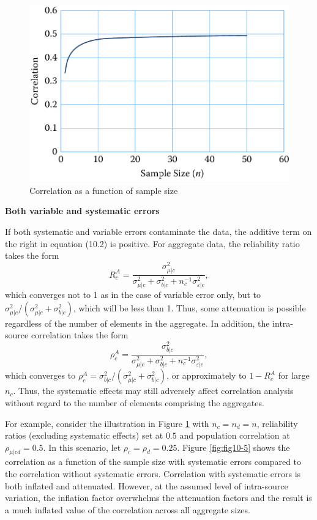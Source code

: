 \documentclass[]{krantz}
\begin{document}
\begin{figure}

{\centering \includegraphics[width=0.7\linewidth]{ChapterError/figures/fig10-4} 

}

\caption{Correlation as a function of sample size}\label{fig:fig10-4}
\end{figure}

\textbf{Both variable and systematic errors}

If both systematic and variable errors contaminate the data, the
additive term on the right in equation (10.2) is positive. For aggregate
data, the reliability ratio takes the form \[\label{eq:10-1.8}
R_c^A = \frac{{\sigma_{\mu |c}^2}}{{\sigma_{\mu |c}^2 + \sigma
_{b|c}^2 + n_c^{ - 1}\sigma_{\varepsilon |c}^2}},\] which converges not
to 1 as in the case of variable error only, but to
\(\sigma_{\mu \vert c}^2 / (\sigma_{\mu \vert c}^2 + \sigma_{b\vert c}^2)\),
which will be less than 1. Thus, some attenuation is possible regardless
of the number of elements in the aggregate. In addition, the
intra-source correlation takes the form \[\label{eq:10-1.9}
\rho_c^A = \frac{{\sigma_{b|c}^2}}{{\sigma_{\mu |c}^2 +
\sigma_{b|c}^2 + n_c^{ - 1}\sigma_{\varepsilon |c}^2}},\] which
converges to
\(\rho_c^A = \sigma_{b|c}^2/(\sigma_{\mu |c}^2 + \sigma _{b|c}^2)\), or
approximately to \(1 - R_c^A\) for large \(n_c\). Thus, the systematic
effects may still adversely affect correlation analysis without regard
to the number of elements comprising the aggregates.

For example, consider the illustration in Figure \ref{fig:fig10-4} with
\(n_c = n_d = n\), reliability ratios (excluding systematic effects) set
at \(0.5\) and population correlation at \(\rho_{\mu \vert cd} = 0.5\).
In this scenario, let \(\rho_c = \rho_d = 0.25\). Figure
\ref{fig:fig10-5} shows the correlation as a function of the sample size
with systematic errors compared to the correlation without systematic
errors. Correlation with systematic errors is both inflated and
attenuated. However, at the assumed level of intra-source variation, the
inflation factor overwhelms the attenuation factors and the result is a
much inflated value of the correlation across all aggregate sizes.
\end{document}
